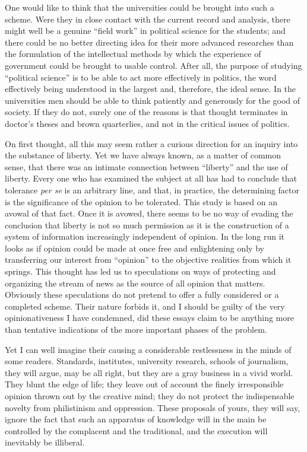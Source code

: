 \documentclass[openany,nobib,twoside,nohyper]{tufte-book}
\begin{document}
One would like to think that the universities could be brought into such
a scheme. Were they in close contact with the current record and
analysis, there might well be a genuine ``field work'' in political
science for the students; and there could be no better directing idea
for their more advanced researches than the formulation of the
intellectual methods by which the experience of government could be
brought to usable control. After all, the purpose of studying
``political science'' is to be able to act more effectively in politics,
the word effectively being understood in the largest and, therefore, the
ideal sense. In the universities men should be able to think patiently
and generously for the good of society. If they do not, surely one of
the reasons is that thought terminates in doctor's theses and brown
quarterlies, and not in the critical issues of politics.

On first thought, all this may seem rather a curious direction for an
inquiry into the substance of liberty. Yet we have always known, as a
matter of common sense, that there was an intimate connection between
``liberty'' and the use of liberty. Every one who has examined the
subject at all has had to conclude that tolerance \emph{per se} is an
arbitrary line, and that, in practice, the determining factor is the
significance of the opinion to be tolerated. This study is based on an
avowal of that fact. Once it is avowed, there seems to be no way of
evading the conclusion that liberty is not so much permission as it is
the construction of a system of information increasingly independent of
opinion. In the long run it looks as if opinion could be made at once
free and enlightening only by transferring our interest from ``opinion''
to the objective realities from which it springs. This thought has led
us to speculations on ways of protecting and organizing the stream of
news as the source of all opinion that matters. Obviously these
speculations do not pretend to offer a fully considered or a completed
scheme. Their nature forbids it, and I should be guilty of the very
opinionativeness I have condemned, did these essays claim to be anything
more than tentative indications of the more important phases of the
problem.

Yet I can well imagine their causing a considerable restlessness in the
minds of some readers. Standards, institutes, university research,
schools of journalism, they will argue, may be all right, but they are a
gray business in a vivid world. They blunt the edge of life; they leave
out of account the finely irresponsible opinion thrown out by the
creative mind; they do not protect the indispensable novelty from
philistinism and oppression. These proposals of yours, they will say,
ignore the fact that such an apparatus of knowledge will in the main be
controlled by the complacent and the traditional, and the execution will
inevitably be illiberal.
\end{document}
